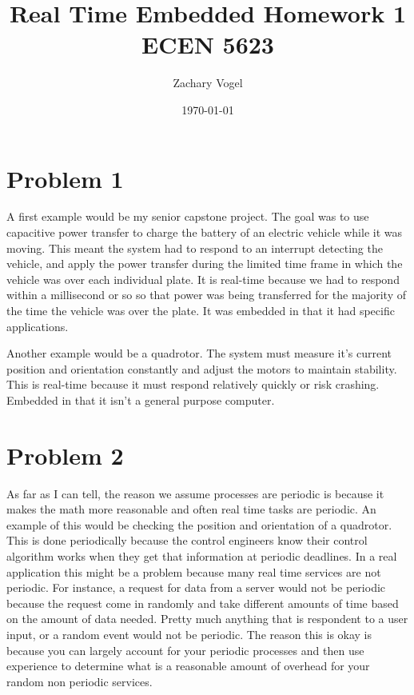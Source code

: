 \documentclass{article}
\author{Zachary Vogel}
\title{Real Time Embedded Homework 1\\ ECEN 5623}
\date{\today}
\begin{document}
\maketitle


\section*{Problem 1}
A first example would be my senior capstone project. The goal was to use capacitive power transfer to charge the battery of an electric vehicle while it was moving. This meant the system had to respond to an interrupt detecting the vehicle, and apply the power transfer during the limited time frame in which the vehicle was over each individual plate. It is real-time because we had to respond within a millisecond or so so that power was being transferred for the majority of the time the
vehicle was over the plate. It was embedded in that it had specific applications.

Another example would be a quadrotor. The system must measure it's current position and orientation constantly and adjust the motors to maintain stability. This is real-time because it must respond relatively quickly or risk crashing. Embedded in that it isn't a general purpose computer.

\section*{Problem 2}
As far as I can tell, the reason we assume processes are periodic is because it makes the math more reasonable and often real time tasks are periodic. An example of this would be checking the position and orientation of a quadrotor. This is done periodically because the control engineers know their control algorithm works when they get that information at periodic deadlines. In a real application this might be a problem because many real time services are not periodic. For instance, a request
for data from a server would not be periodic because the request come in randomly and take different amounts of time based on the amount of data needed. Pretty much anything that is respondent to a user input, or a random event would not be periodic. The reason this is okay is because you can largely account for your periodic processes and then use experience to determine what is a reasonable amount of overhead for your random non periodic services.
\end{document}

